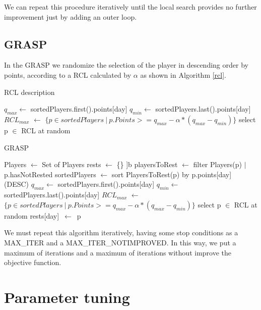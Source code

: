 \documentclass[a4paper, 10pt]{article}
\begin{document}
We can repeat this procedure iteratively until the local search provides no further improvement just by adding an outer loop.


\clearpage
\subsection{GRASP}

In the GRASP we randomize the selection of the player in descending order by points, according to a RCL calculated by $\alpha$ as shown in Algorithm \ref{rcl}.


\begin{algorithm}
	\caption{RCL description} 
  \label{rcl}
	\begin{algorithmic}[1]

    \State $q_{max} \leftarrow $ sortedPlayers.first().points[day]
    \State $q_{min} \leftarrow$ sortedPlayers.last().points[day]
    \State $RCL_{max}$ $\leftarrow$ $\{p \in sortedPlayers\ |\ p.Points >= q_{max} - \alpha * (q_{max} - q_{min})\}$
    \State select p $\in$ RCL at random

	\end{algorithmic} 
\end{algorithm}




\begin{algorithm}
	\caption{GRASP} 
	\begin{algorithmic}[1]
	  \State Players $\leftarrow$ Set of Players
	  \State rests $\leftarrow$ \{\}
	    ]b
	      \State playersToRest $\leftarrow$ filter Players(p) $|$ p.hasNotRested
	      \State sortedPlayers $\leftarrow$ sort PlayersToRest(p) by p.points[day] (DESC) 
        \State $q_{max} \leftarrow $ sortedPlayers.first().points[day]
        \State $q_{min} \leftarrow$ sortedPlayers.last().points[day]
        \State $RCL_{max}$ $\leftarrow$ $\{p \in sortedPlayers\ |\ p.Points >= q_{max} - \alpha * (q_{max} - q_{min})\}$
	      \State select p $\in$ RCL at random
	      \State rests[day]\ $\leftarrow$\ p
	    \EndFor
	\end{algorithmic} 
\end{algorithm}

We must repeat this algorithm iteratively, having some stop conditions as a MAX\_ITER and a MAX\_ITER\_NOTIMPROVED. In this way, we put a maximum of iterations and a maximum of iterations without improve the objective function.
\clearpage


\section{Parameter tuning} 
\end{document}
